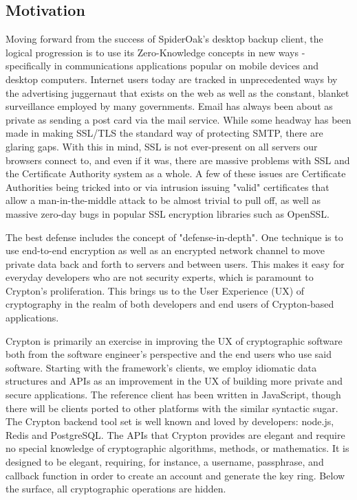 \documentclass[conference]{IEEEtran}
\begin{document}
\subsection{Motivation}
Moving forward from the success of SpiderOak's desktop backup client,
the logical progression is to use its Zero-Knowledge concepts in new ways -
specifically in communications applications popular on mobile devices
and desktop computers. Internet users today are tracked in unprecedented
ways by the advertising juggernaut that exists on the web as well as the
constant, blanket surveillance employed by many governments.
Email has always been about as private as sending a post card via the mail
service. While some headway has been made in making SSL/TLS the standard
way of protecting SMTP, there are glaring gaps. With this in mind,
SSL is not ever-present on all servers our browsers connect to,
and even if it was, there are massive problems with SSL and the
Certificate Authority system as a whole. A few of these issues are
Certificate Authorities being tricked into or via intrusion issuing
"valid" certificates that allow a man-in-the-middle attack to be almost
trivial to pull off, as well as massive zero-day bugs in popular SSL
encryption libraries such as OpenSSL.

The best defense includes the concept of "defense-in-depth"\cite{defenseindepth}.
One technique is to use end-to-end encryption as well as an encrypted network
channel to move private data back and forth to servers and between users.
This makes it easy for everyday developers who are not security experts, which  is paramount to Crypton's proliferation. This brings us to the User Experience (UX) of cryptography in the realm of both developers and end users of Crypton-based applications.

Crypton is primarily an exercise in improving the UX of cryptographic
software both from the software engineer's perspective and the
end users who use said software. Starting with the framework's clients,
we employ idiomatic data structures and APIs as an improvement in the UX of building
more private and secure applications. The reference client has been written in
JavaScript, though there will be clients ported to other platforms with the similar
syntactic sugar. The Crypton backend tool set is well known
and loved by developers: node.js, Redis and PostgreSQL. The APIs that
Crypton provides are elegant and require no special knowledge of cryptographic
algorithms, methods, or mathematics. It is designed to be elegant, requiring,
for instance, a username, passphrase, and callback function in order to create
an account and generate the key ring. Below the surface, all cryptographic
operations are hidden.
\end{document}
